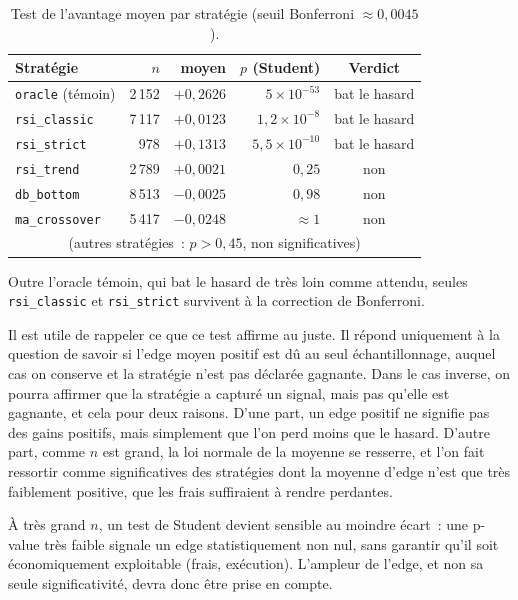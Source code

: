 \begin{table}[H]
\centering
\caption{Test de l'avantage moyen par stratégie (seuil Bonferroni $\approx 0{,}0045$).}
\label{tab:b1-etape1}
\small
\begin{tabular}{@{}lrrrc@{}}
\toprule
Stratégie & $n$ & \edgevar{} moyen & $p$ (Student) & Verdict \\
\midrule
\texttt{oracle} (témoin) & 2\,152 & $+0{,}2626$ & $5\times10^{-53}$    & bat le hasard \\
\midrule
\texttt{rsi\_classic} & 7\,117 & $+0{,}0123$ & $1{,}2\times10^{-8}$  & bat le hasard \\
\texttt{rsi\_strict}  &   978  & $+0{,}1313$ & $5{,}5\times10^{-10}$ & bat le hasard \\
\texttt{rsi\_trend}   & 2\,789 & $+0{,}0021$ & $0{,}25$             & non \\
\texttt{db\_bottom}   & 8\,513 & $-0{,}0025$ & $0{,}98$             & non \\
\texttt{ma\_crossover}& 5\,417 & $-0{,}0248$ & $\approx 1$          & non \\
\multicolumn{5}{c}{\footnotesize (autres stratégies~: $p>0{,}45$, non significatives)} \\
\bottomrule
\end{tabular}
\end{table}

Outre l'oracle témoin, qui bat le hasard de très loin comme attendu,
seules \texttt{rsi\_classic} et \texttt{rsi\_strict} survivent à la
correction de Bonferroni.

Il est utile de rappeler ce que ce test affirme au juste. Il répond
uniquement à la question de savoir si l'edge moyen positif est dû au
seul échantillonnage, auquel cas on conserve \Hzero{} et la stratégie
n'est pas déclarée gagnante. Dans le cas inverse, on pourra affirmer que
la stratégie a capturé un signal, mais pas qu'elle est gagnante, et cela
pour deux raisons. D'une part, un edge positif ne signifie pas des gains
positifs, mais simplement que l'on perd moins que le hasard. D'autre
part, comme \(n\) est grand, la loi normale de la moyenne se resserre,
et l'on fait ressortir comme significatives des stratégies dont la
moyenne d'edge n'est que très faiblement positive, que les frais
suffiraient à rendre perdantes.

\begin{limites}
À très grand $n$, un test de Student devient sensible au moindre écart~:
une p-value très faible signale un edge statistiquement non nul, sans
garantir qu'il soit économiquement exploitable (frais, exécution).
L'ampleur de l'edge, et non sa seule significativité, devra donc être
prise en compte.
\end{limites}

